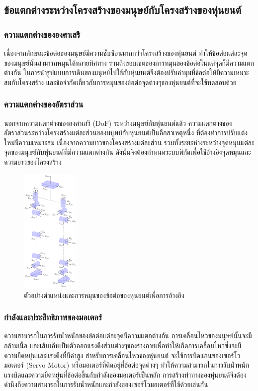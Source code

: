 \subsection{ข้อแตกต่างระหว่างโครงสร้างของมนุษย์กับโครงสร้างของหุ่นยนต์}

\subsubsection{ความแตกต่างขององศาเสรี}
เนื่องจากลักษณะข้อต่อของมนุษย์มีความซับซ้อนมากกว่าโครงสร้างของหุ่นยนต์
ทำให้ข้อต่อแต่ละจุดของมนุษย์นั้นสามารถหมุนได้หลายทิศทาง รวมถึงขอบเขตของการหมุนของข้อต่อในแต่จุดก็มีความแตกต่างกัน
ในการนำรูปแบบการเดินของมนุษย์ไปใช้กับหุ่นยนต์จึงต้องปรับค่ามุมที่ข้อต่อให้มีความเหมาะสมกับโครงสร้าง
และข้อจำกัดเกี่ยวกับการหมุนของข้อต่อจุดต่างๆของหุ่นยนต์ที่จะใช้ทดสอบด้วย

\subsubsection{ความแตกต่างของอัตราส่วน}
นอกจากความแตกต่างขององศาเสรี (DoF) ระหว่างมนุษย์กับหุ่นยนต์แล้ว
ความแตกต่างของอัตราส่วนระหว่างโครงสร้างแต่ละส่วนของมนุษย์กับหุ่นยนต์เป็นอีกสาเหตุหนึ่ง
ที่ต้องทำการปรับแต่งใหม่มีความเหมาะสม เนื่องจากความยาวของโครงสร้างแต่ละส่วน
รวมทั้งระยะห่างระหว่างจุดหมุนแต่ละจุดของมนุษย์กับหุ่นยนต์ที่มีความแตกต่างกัน
ดังนั้นจึงต้องกำหนดระบบพิกัดเพื่อใช้อ้างอิงจุดหมุนและความยาวของโครงสร้าง
\begin{figure}[H]
    \centering
    \includegraphics[width=0.25\textwidth]{chapter2/images/uthai_kinematics.png}
    \caption{ตัวอย่างตำแหน่งและการหมุนของข้อต่อของหุ่นยนต์เพื่อการอ้างอิง}
    \label{fig:robot_frame}
\end{figure}


\subsubsection{กำลังและประสิทธิภาพของมอเตอร์}
ความสามารถในการรับน้ำหนักของข้อต่อแต่ละจุดมีความแตกต่างกัน การเคลื่อนไหวของมนุษย์นั้นจะมีกล้ามเนื้อ
และเส้นเอ็นเป็นตัวออกแรงดึงส่วนต่างๆของร่างกายเพื่อทำให้เกิดการเคลื่อนไหวซึ่งจะมีความยืดหยุ่นและแรงดึงที่มีค่าสูง
สำหรับการเคลื่อนไหวของหุ่นยนต์ จะใช้การบิดแกนของเซอร์โวมอเตอร์ (Servo Motor) หรือมอเตอร์ที่ติดอยู่ที่ข้อต่อจุดต่างๆ
ทำให้ความสามารถในการรับน้ำหนัก แรงบิดและความยืดหยุ่นที่ข้อต่อขึ้นกับกำลังของมอเตอร์เป็นหลัก
การสร้างท่าทางของหุ่นยนต์จึงต้องคำนึงถึงความสามารถในการรับน้ำหนักและกำลังของเซอร์โวมอเตอร์ที่ใช้ด้วยเช่นกัน




